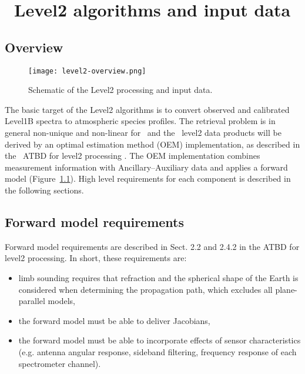 \chapter{\smr\ Level2 algorithms and input data}
\label{level2-algorithms}
\section{Overview}


\begin{figure}[t]
\centering
\texttt{[image: level2-overview.png]}
\caption{Schematic of the Level2 processing and input data.}
\label{fig:level2}
\end{figure}

The basic target of the Level2 algorithms is to
convert observed and calibrated Level1B spectra
to atmospheric species profiles.
The retrieval problem is in general non-unique 
and non-linear for \smr\,  
and the \smr\ level2 data products will be derived by an
optimal estimation method (OEM) implementation, as described
in the \smr\ ATBD for level2 processing \citep{atbdl2}.
The OEM implementation combines measurement information with 
Ancillary--Auxiliary data and applies a forward 
model (Figure~\ref{fig:level2}). High level requirements for each 
component is described in the following sections.

\section{Forward model requirements}

Forward model requirements are described in Sect. 2.2
and 2.4.2 in the ATBD for level2 processing.
In short, these requirements are:

\begin{itemize}

\item limb sounding requires that refraction and the spherical shape
of the Earth is considered when determining the propagation path,
which excludes all plane-parallel models,

\item the forward model must be able to deliver Jacobians,

\item the forward model must be able to incorporate effects of
sensor characteristics (e.g. antenna angular response, sideband filtering,
frequency response of each spectrometer channel).

\end{itemize}

